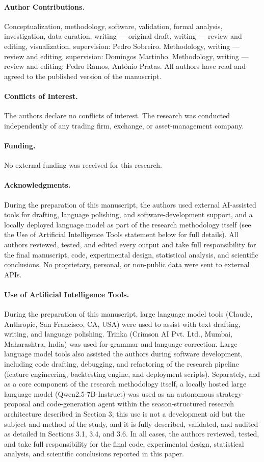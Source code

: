 \documentclass[11pt,a4paper]{article}
\newcommand{\authorcontributions}[1]{\vspace{1em}\paragraph*{Author Contributions.}#1}
\newcommand{\conflictsofinterest}[1]{\vspace{1em}\paragraph*{Conflicts of Interest.}#1}
\newcommand{\funding}[1]{\vspace{1em}\paragraph*{Funding.}#1}
\newcommand{\acknowledgments}[1]{\vspace{1em}\paragraph*{Acknowledgments.}#1}
\newcommand{\useofartificialintelligence}[1]{\vspace{1em}\paragraph*{Use of Artificial Intelligence Tools.}#1}
\begin{document}
\authorcontributions{Conceptualization, methodology, software, validation, formal analysis, investigation, data curation, writing --- original draft, writing --- review and editing, visualization, supervision: Pedro Sobreiro. Methodology, writing --- review and editing, supervision: Domingos Martinho. Methodology, writing --- review and editing: Pedro Ramos, António Pratas. All authors have read and agreed to the published version of the manuscript.}

\conflictsofinterest{The authors declare no conflicts of interest. The research was conducted independently of any trading firm, exchange, or asset-management company.}

\funding{No external funding was received for this research.}

\acknowledgments{During the preparation of this manuscript, the authors used external AI-assisted tools for drafting, language polishing, and software-development support, and a locally deployed language model as part of the research methodology itself (see the Use of Artificial Intelligence Tools statement below for full details). All authors reviewed, tested, and edited every output and take full responsibility for the final manuscript, code, experimental design, statistical analysis, and scientific conclusions. No proprietary, personal, or non-public data were sent to external APIs.}

\useofartificialintelligence{During the preparation of this manuscript, large language model tools (Claude, Anthropic, San Francisco, CA, USA) were used to assist with text drafting, writing, and language polishing. Trinka (Crimson AI Pvt. Ltd., Mumbai, Maharashtra, India) was used for grammar and language correction. Large language model tools also assisted the authors during software development, including code drafting, debugging, and refactoring of the research pipeline (feature engineering, backtesting engine, and deployment scripts). Separately, and as a core component of the research methodology itself, a locally hosted large language model (Qwen2.5-7B-Instruct) was used as an autonomous strategy-proposal and code-generation agent within the season-structured research architecture described in Section 3; this use is not a development aid but the subject and method of the study, and it is fully described, validated, and audited as detailed in Sections 3.1, 3.4, and 3.6. In all cases, the authors reviewed, tested, and take full responsibility for the final code, experimental design, statistical analysis, and scientific conclusions reported in this paper.}
\end{document}
